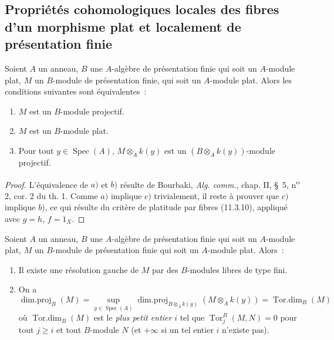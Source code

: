 \subsection{Propriétés cohomologiques locales des fibres d'un morphisme plat et
localement de présentation finie}
\label{subsection:IV.12.3-fr}

\begin{lemma}[12.3.1]
\label{IV.12.3.1-fr}
Soient $A$ un anneau, $B$ une $A$-algèbre de présentation finie qui soit un
$A$-module plat, $M$ un $B$-module de présentation finie, qui soit un
$A$-module plat. Alors les conditions suivantes sont équivalentes~:
\begin{enumerate}[label=\emph{\alph*)}]
  \item $M$ est un $B$-module projectif.
  \item $M$ est un $B$-module plat.
  \item Pour tout $y\in\operatorname{Spec}(A)$, $M\otimes_Ak(y)$ est un
  $(B\otimes_Ak(y))$-module projectif.
\end{enumerate}
\end{lemma}

\begin{proof}
L'équivalence de $a)$ et $b)$ résulte de Bourbaki, \emph{Alg. comm.}, chap. II,
\S~5, n\textsuperscript{o} 2, cor. 2 du th. 1. Comme $a)$ implique $c)$
trivialement, il reste à prouver que $c)$ implique $b)$, ce qui résulte du
critère de platitude par fibres (11.3.10), appliqué avec $g=h$, $f=1_X$.
\end{proof}

\begin{proposition}[12.3.2]
\label{IV.12.3.2-fr}
Soient $A$ un anneau, $B$ une $A$-algèbre de présentation finie qui soit un
$A$-module plat, $M$ un $B$-module de présentation finie qui soit un
$A$-module plat. Alors~:
\begin{enumerate}[label=(\roman*)]
  \item Il existe une résolution gauche de $M$ par des $B$-modules libres de
  type fini.
  \item On a
  \begin{equation}
    \tag{12.3.2.1}
    \label{IV.12.3.2.1-fr}
    \operatorname{dim.proj}_B(M)
    =\sup_{y\in\operatorname{Spec}(A)}
    \operatorname{dim.proj}_{B\otimes_Ak(y)}(M\otimes_Ak(y))
    =\operatorname{Tor.dim}_B(M)
  \end{equation}
  où $\operatorname{Tor.dim}_B(M)$ est le \emph{plus petit entier} $i$ tel que
  $\operatorname{Tor}^B_j(M,N)=0$ pour tout $j\geq i$ et tout $B$-module $N$
  (et $+\infty$ si un tel entier $i$ n'existe pas).
\end{enumerate}
\end{proposition}

